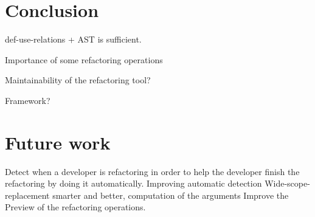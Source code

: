 \section{Conclusion}
def-use-relations + AST is sufficient.

Importance of some refactoring operations

Maintainability of the refactoring tool?

Framework?
\section{Future work}
Detect when a developer is refactoring in order to help the developer finish the
refactoring by doing it automatically.
Improving automatic detection
Wide-scope-replacement smarter and better, computation of the arguments
Improve the Preview of the refactoring operations.
